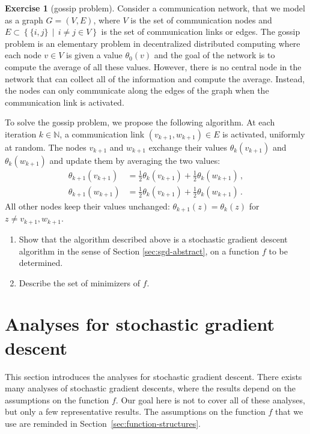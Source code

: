 \documentclass[11pt,reqno]{article}
\newcommand{\N}{\mathbb{N}}
\numberwithin{equation}{section}
\theoremstyle{plain}
\theoremstyle{definition}
\newtheorem{exercice}[assumption]{Exercise}
\theoremstyle{remark}
\begin{document}
\begin{exercice}[gossip problem]
	\label{exer:gossip}
	Consider a communication network, that we model as a graph $G = (V,E)$, where $V$ is the set of communication nodes and $E \subset \left\{\{i,j\} \, \middle\vert  \, i \neq j \in V \right\}$ is the set of communication links or edges. The gossip problem is an elementary problem in decentralized distributed computing where each node $v \in V$ is given a value $\theta_0(v)$ and the goal of the network is to compute the average of all these values. However, there is no central node in the network that can collect all of the information and compute the average. Instead, the nodes can only communicate along the edges of the graph when the communication link is activated.

	To solve the gossip problem, we propose the following algorithm. At each iteration $k \in \N$, a communication link $(v_{k+1}, w_{k+1}) \in E$ is activated, uniformly at random. The nodes $v_{k+1}$ and $w_{k+1}$ exchange their values $\theta_k(v_{k+1})$ and $\theta_k(w_{k+1})$ and update them by averaging the two values:
	\begin{align*}
		\theta_{k+1}(v_{k+1}) &= \frac{1}{2} \theta_k(v_{k+1}) + \frac{1}{2} \theta_k(w_{k+1}) \, , \\
		\theta_{k+1}(w_{k+1}) &= \frac{1}{2} \theta_k(v_{k+1}) + \frac{1}{2} \theta_k(w_{k+1}) \, .
	\end{align*}
	All other nodes keep their values unchanged: $\theta_{k+1}(z) = \theta_k(z)$ for $z \neq v_{k+1}, w_{k+1}$. 
	
	\begin{enumerate}
		\item Show that the algorithm described above is a stochastic gradient descent algorithm in the sense of Section \ref{sec:sgd-abstract}, on a function $f$ to be determined.
	\item Describe the set of minimizers of $f$.
	\end{enumerate}
\end{exercice}

\section{Analyses for stochastic gradient descent}
\label{sec:analysis}

This section introduces the analyses for stochastic gradient descent. There exists many analyses of stochastic gradient descents, where the results depend on the assumptions on the function $f$. Our goal here is not to cover all of these analyses, but only a few representative results. The assumptions on the function $f$ that we use are reminded in Section~\ref{sec:function-structures}. 
\end{document}
